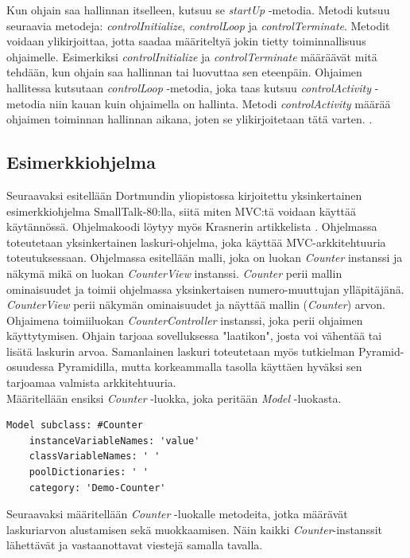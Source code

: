\documentclass[finnish,utf8,nonumbib,palatino,kandi]{gradu2}
\begin{document}
Kun ohjain saa hallinnan itselleen, kutsuu se \emph{startUp} -metodia. Metodi kutsuu seuraavia metodeja: \emph{controlInitialize}, \emph{controlLoop} ja \emph{controlTerminate}. Metodit
voidaan ylikirjoittaa, jotta saadaa määriteltyä jokin tietty toiminnallisuus ohjaimelle. Esimerkiksi \emph{controlInitialize} ja \emph{controlTerminate} määräävät mitä tehdään, kun ohjain saa hallinnan tai luovuttaa sen eteenpäin. Ohjaimen hallitessa kutsutaan
\emph{controlLoop} -metodia, joka taas kutsuu \emph{controlActivity} -metodia niin kauan kuin ohjaimella on hallinta.  Metodi \emph{controlActivity} määrää ohjaimen toiminnan hallinnan aikana, joten se ylikirjoitetaan tätä varten. \cite{Krasner:desc}. 


\subsection{Esimerkkiohjelma}
Seuraavaksi esitellään  Dortmundin yliopistossa kirjoitettu yksinkertainen esimerkkiohjelma SmallTalk-80:lla, siitä miten MVC:tä voidaan käyttää
käytännössä. Ohjelmakoodi löytyy myös Krasnerin artikkelista \cite{Krasner:desc}. Ohjelmassa toteutetaan yksinkertainen laskuri-ohjelma, joka käyttää MVC-arkkitehtuuria toteutuksessaan. Ohjelmassa esitellään malli, joka on luokan \emph{Counter} instanssi ja näkymä mikä on luokan \emph{CounterView} instanssi. \emph{Counter} perii mallin ominaisuudet ja 
toimii ohjelmassa yksinkertaisen numero-muuttujan ylläpitäjänä. \emph{CounterView} perii näkymän ominaisuudet ja näyttää mallin (\emph{Counter}) arvon.
Ohjaimena toimiiluokan \emph{CounterController} instanssi, joka perii ohjaimen käyttytymisen. Ohjain tarjoaa sovelluksessa "laatikon", josta voi vähentää
tai lisätä laskurin arvoa. Samanlainen laskuri toteutetaan myös tutkielman Pyramid-osuudessa Pyramidilla, mutta korkeammalla tasolla käyttäen hyväksi
sen tarjoamaa valmista arkkitehtuuria.  \\

Määritellään ensiksi \emph{Counter} -luokka, joka peritään \emph{Model} -luokasta.
\begin{lstlisting}[language=Smalltalk]
Model subclass: #Counter
	instanceVariableNames: 'value'
	classVariableNames: ' '
	poolDictionaries: ' '
  	category: 'Demo-Counter'
\end{lstlisting} 

Seuraavaksi määritellään \emph{Counter} -luokalle metodeita, jotka määrävät
laskuriarvon alustamisen sekä muokkaamisen. Näin kaikki \emph{Counter}-instanssit
lähettävät ja vastaanottavat viestejä samalla tavalla.
\end{document}
